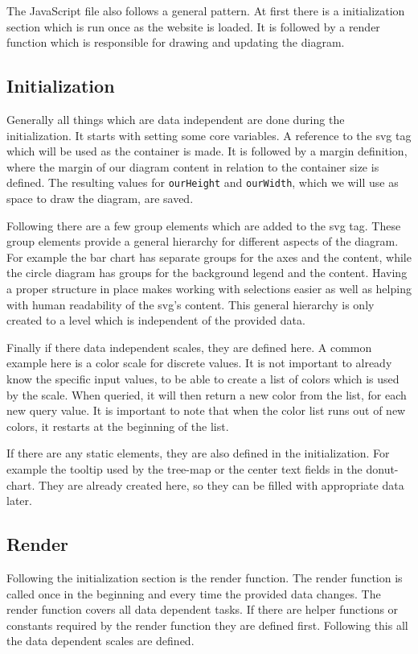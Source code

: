 The JavaScript file also follows a general pattern. At first there is a initialization section which is run once as the website is loaded. It is followed by a render function which is responsible for drawing and updating the diagram. 

\subsection{Initialization}
Generally all things which are data independent are done during the initialization. It starts with setting some core variables. A reference to the svg tag which will be used as the container is made. It is followed by a margin definition, where the margin of our diagram content in relation to the container size is defined. The resulting values for \verb|ourHeight| and \verb|ourWidth|, which we will use as space to draw the diagram, are saved. 

Following there are a few group elements which are added to the svg tag. These group elements provide a general hierarchy for different aspects of the diagram. For example the bar chart has separate groups for the axes and the content, while the circle diagram has groups for the background legend and the content. Having a proper structure in place makes working with selections easier as well as helping with human readability of the svg's content. This general hierarchy is only created to a level which is independent of the provided data.

Finally if there data independent scales, they are defined here. A common example here is a color scale for discrete values. It is not important to already know the specific input values, to be able to create a list of colors which is used by the scale. When queried, it will then return a new color from the list, for each new query value. It is important to note that when the color list runs out of new colors, it restarts at the beginning of the list.

If there are any static elements, they are also defined in the initialization. For example the tooltip used by the tree-map or the center text fields in the donut-chart. They are already created here, so they can be filled with appropriate data later.

\subsection{Render}
Following the initialization section is the render function. The render function is called once in the beginning and every time the provided data changes. The render function covers all data dependent tasks. If there are helper functions or constants required by the render function they are defined first. Following this all the data dependent scales are defined.

